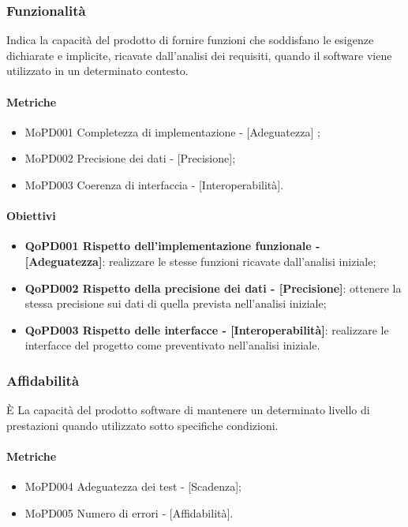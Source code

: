 \documentclass[../piano-di-qualifica.tex]{subfiles}
\begin{document}
\subsubsection{Funzionalità}%
\label{sub:funzionalita}
Indica la capacità del prodotto di fornire funzioni che soddisfano le esigenze dichiarate e implicite, ricavate dall'analisi dei requisiti, quando il software viene utilizzato in un determinato contesto.

\paragraph{Metriche}
\label{sub:metriche}
\begin{itemize}
    \item MoPD001 Completezza di implementazione - [Adeguatezza] ;
    \item MoPD002 Precisione dei dati - [Precisione];
    \item MoPD003 Coerenza di interfaccia - [Interoperabilità].
\end{itemize}

\paragraph{Obiettivi}
\label{sub:obiettivi}
\begin{itemize}
    \item \textbf{QoPD001 Rispetto dell'implementazione funzionale - [Adeguatezza]}: realizzare le stesse funzioni ricavate dall'analisi iniziale;
    \item \textbf{QoPD002 Rispetto della precisione dei dati - [Precisione]}: ottenere la stessa precisione sui dati di quella prevista nell'analisi iniziale;
    \item \textbf{QoPD003 Rispetto delle interfacce - [Interoperabilità]}: realizzare le interfacce del progetto come preventivato nell'analisi iniziale.
\end{itemize}

\subsubsection{Affidabilità}%
\label{sub:affidabilita}
È La capacità del prodotto software di mantenere un determinato livello di prestazioni quando utilizzato sotto specifiche condizioni.

\paragraph{Metriche}
\label{sub:metriche}
\begin{itemize}
    \item MoPD004 Adeguatezza dei test - [Scadenza];
    \item MoPD005 Numero di errori - [Affidabilità].
\end{itemize}
\end{document}
